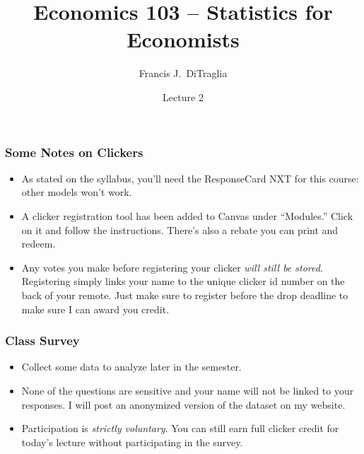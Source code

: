\documentclass[handout]{beamer}
\title[Econ 103]{Economics 103 -- Statistics for Economists}
\author[F. DiTraglia]{Francis J.\ DiTraglia}
\institute{University of Pennsylvania}
\date{Lecture 2}
\begin{document}
 





\begin{frame}[plain]
	\titlepage 
	

\end{frame} 
\begin{frame}
\frametitle{Some Notes on Clickers}

\begin{itemize}
	\item As stated on the syllabus, you'll need the ResponseCard NXT for this course: other models won't work.
	\item A clicker registration tool has been added to Canvas under ``Modules.'' Click on it and follow the instructions. There's also a rebate you can print and redeem.
	\item Any votes you make before registering your clicker \emph{will still be stored}. Registering simply links your name to the unique clicker id number on the back of your remote. \alert{Just make sure to register before the drop deadline to make sure I can award you credit.}
\end{itemize}



\end{frame}


\begin{frame}\frametitle{Class Survey}
 
\begin{itemize}
	\item Collect some data to analyze later in the semester.
	\item None of the questions are sensitive and your name will not be linked to your responses. I will post an anonymized version of the dataset on my website.
	\item Participation is  \emph{strictly voluntary}. You can still earn full clicker credit for today's lecture without participating in the survey.
\end{itemize}


\end{frame}
\end{document}
